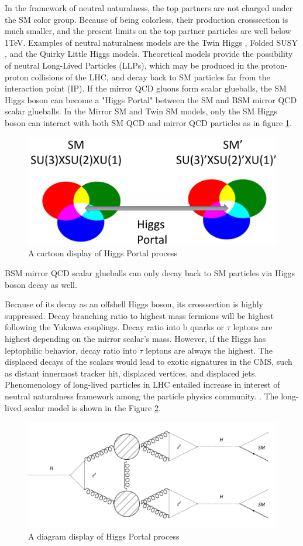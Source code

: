 In the framework of neutral naturalness, the top partners are not charged under the SM color group. 
Because of being colorless, their production crosssection is much smaller, and the present limits on the top partner particles are well below 1TeV. 
Examples of neutral naturalness models are the Twin Higgs \cite{Chacko:2005pe},
Folded SUSY \cite{Burdman:2006tz}, and the Quirky Little Higgs \cite{Cai:2008au} models.
Theoretical models provide the possibility of neutral Long-Lived Particles (LLPs), which may be produced in the proton-proton
collisions of the LHC, and decay back to SM particles far from the interaction point (IP).\cite{Craig:2015pha}
If the mirror QCD gluons form scalar glueballs, the SM Higgs boson can become a "Higgs Portal" between the SM and BSM mirror QCD scalar glueballs. 
In the Mirror SM and Twin SM models, only the SM Higgs boson can interact with both SM QCD and mirror QCD particles as in figure \ref{fig:2HiggsPortal}.
\begin{figure}[h!]
  \caption{A cartoon display of Higgs Portal process}
  \label{fig:2HiggsPortal}
  \centering
  \includegraphics[width=0.87\linewidth]{figs/Portalcartoon.png}
\end{figure}
BSM mirror QCD scalar glueballs can only decay back to SM particles via Higgs boson decay as well.

Because of its decay as an offshell Higgs boson, its crosssection is highly suppressed. 
Decay branching ratio to highest mass fermions will be highest following the Yukawa couplings.
Decay ratio into b quarks or $\tau$ leptons are highest depending on the mirror scalar's mass.
However, if the Higgs has leptophilic behavior, decay ratio into $\tau$ leptons are always the highest.
The displaced decays of the scalars would lead to exotic signatures in the CMS, such as distant innermost tracker hit, displaced vertices, and displaced jets.
Phenomenology of long-lived particles in LHC entailed increase in interest of neutral naturalness framework among the particle physics community. \cite{Curtin:2015fna,Csaki:2015fba}.
The long-lived scalar model is shown in the Figure \ref{fig:HiggsPortal}.

\begin{figure}[h!]
  \caption{A diagram display of Higgs Portal process}
  \label{fig:HiggsPortal}
  \centering
  \includegraphics[width=0.87\linewidth]{figs/TwinHiggs.png}
\end{figure}
